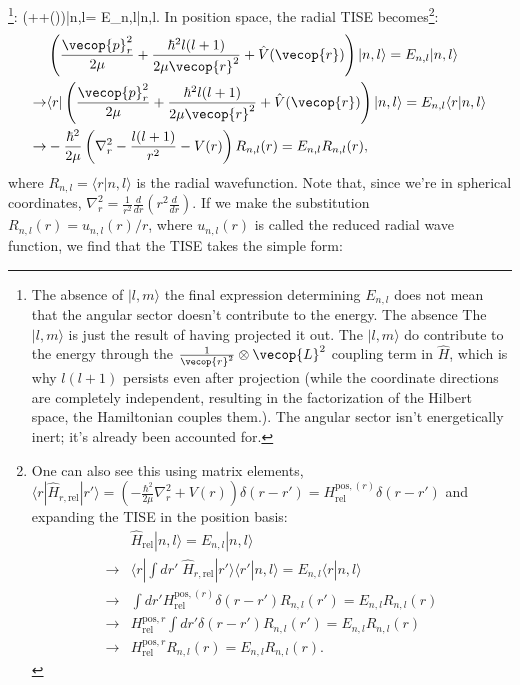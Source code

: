 \footnote{
The absence of $|l,m\rangle$ the final expression determining $E_{n,l}$ does not mean that the angular sector doesn't contribute to the energy. The absence The $|l,m\rangle$ is just the result of having projected it out. The $|l,m\rangle$ do contribute to the energy through the $\frac{1}{\vecop{r}^2}\otimes\vecop{L}^2$ coupling term in $\hat{H}$, which is why $l(l+1)$ persists even after projection (while the coordinate directions are completely independent, resulting in the factorization of the Hilbert space, the Hamiltonian couples them.). The angular sector isn't energetically inert; it's already been accounted for.
}:
\be
    \left(++()\right)|n,l\rangle = E_{n,l}|n,l\rangle.
\ee
In position space, the radial TISE becomes\footnote{
One can also see this using matrix elements, $\langle r|\hat{H}_{r,\text{rel}}|r'\rangle =\left(-\frac{\hbar^2}{2\mu}\nabla^2_r+V(r)\right)\delta(r-r')=H^{\text{pos},(r)}_{\text{rel}}\delta({r}-{r}')$ and expanding the TISE in the position basis:
\begin{align*}
    &\hat{H}_\text{rel}|n,l\rangle = E_{n,l}|n,l\rangle\\
    \rightarrow& \langle r|\int dr'\; \hat{H}_{r,\text{rel}}|{r}'\rangle\langle {r}'|n,l\rangle =E_{n,l}\langle {r}|n,l\rangle\\
    \rightarrow& \int dr'H^{\text{pos},({r})}_{\text{rel}} \delta({r}-{r}')R_{n,l}({r}') = E_{n,l}R_{n,l}({r})\\
    \rightarrow&H_{\text{rel}}^{\text{pos},{r}}\int dr' \delta({r}-{r}')R_{n,l}({r}')=E_{n,l}R_{n,l}({r}) \\ 
    \rightarrow& H^{\text{pos},r}_\text{rel}R_{n,l}({r}) = E_{n,l}R_{n,l}({r}).
\end{align*}
}:
\begin{align*}
    &\left(\frac{\vecop{p}_r^2}{2\mu}+\frac{\hbar^2l(l+1)}{2\mu\vecop{r}^2}+\hat{V}(\vecop{r})\right)|n,l\rangle = E_{n,l}|n,l\rangle\\
    \rightarrow&\langle r|\left(\frac{\vecop{p}_r^2}{2\mu}+\frac{\hbar^2l(l+1)}{2\mu\vecop{r}^2}+\hat{V}(\vecop{r})\right)|n,l\rangle = E_{n,l}\langle r|n,l\rangle\\
    \rightarrow& -\frac{\hbar^2}{2\mu}\left(\nabla_r^2-\frac{l(l+1)}{r^2}-V(r)  \right)R_{n,l}(r) = E_{n,l}R_{n,l}(r),\\
\end{align*}
where $R_{n,l}=\langle r|n,l\rangle$ is the radial wavefunction. Note that, since we're in spherical coordinates, $\nabla_r^2=\frac{1}{r^2}\frac{d}{dr}(r^2\frac{d}{dr})$. If we make the substitution $R_{n,l}(r)=u_{n,l}(r)/r$, where $u_{n,l}(r)$ is called the reduced radial wave function, we find that the TISE takes the simple form:

